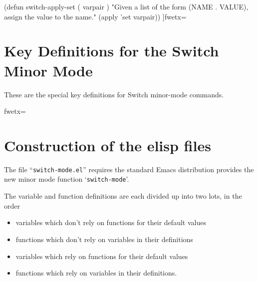 {(defun switch-apply-set ( varpair )
  "Given a list of the form (NAME . VALUE), assign the value
to the name."
  (apply 'set varpair))
]fwetx=%
\fwcdef 
\fwbeginmacronotes
{}
\fwendmacronotes
\fwendmacro


\chapter{Key Definitions for the Switch Minor Mode}
These are the special key definitions for Switch minor-mode commands.

\fwbeginmacro
{}\fwequals \fwodef {}fwetx=%
\fwcdef 
\fwbeginmacronotes
{}
\fwendmacronotes
\fwendmacro


\chapter{Construction of the elisp files}
The file ``{\tt switch-mode.el}'' requires the standard Emacs
distribution provides the new minor mode function `{\tt switch-mode}'.

The variable and function definitions are each divided up into two
lots, in the order
\begin{itemize}
  \item variables which don't rely on functions for their default
        values
  \item functions which don't rely on variables in their definitions
  \item variables which rely on functions for their default
        values
  \item functions which rely on variables in their definitions.
\end{itemize}

}
